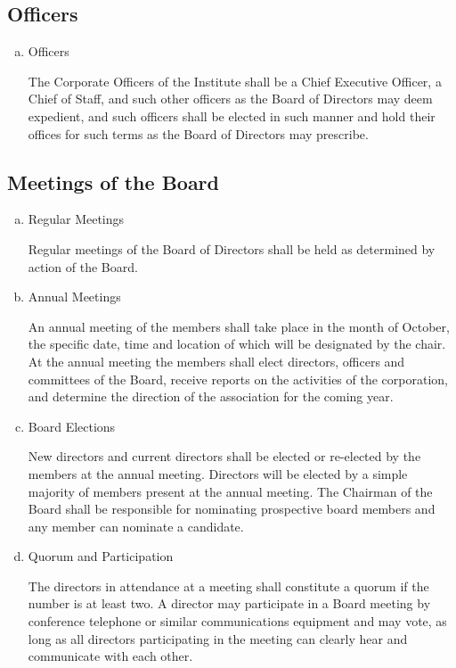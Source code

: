 \subsection{Officers}

\begin{enumerate}[(a)]
\item Officers

The Corporate Officers of the Institute shall be a Chief Executive Officer, a Chief of Staff, and such other officers as the Board of Directors may deem expedient, and such officers shall be elected in such manner and hold their offices for such terms as the Board of Directors may prescribe.
\end{enumerate}

\subsection{Meetings of the Board}
\begin{enumerate}[(a)]
\item Regular Meetings

Regular meetings of the Board of Directors shall be held as determined by action of the Board.

\item Annual Meetings

An annual meeting of the members shall take place in the month of October, the specific date, time and location of which will be designated by the chair. At the annual meeting the members shall elect directors, officers and committees of the Board, receive reports on the activities of the corporation, and determine the direction of the association for the coming year.

\item Board Elections

New directors and current directors shall be elected or re-elected by the members at the annual meeting. Directors will be elected by a simple majority of members present at the annual meeting. The Chairman of the Board shall be responsible for nominating prospective board members and any member can nominate a candidate. 

\item Quorum and Participation

The directors in attendance at a meeting shall constitute a quorum if the number is at least two. A director may participate in a Board meeting by conference telephone or similar communications equipment and may vote, as long as all directors participating in the meeting can clearly hear and communicate with each other.

\end{enumerate}



    
    
    
    
    